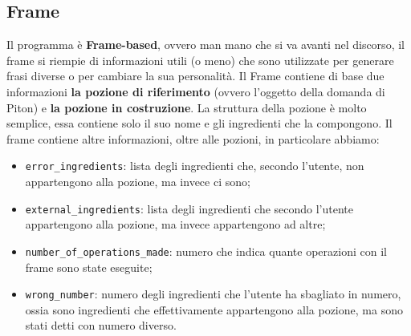 \subsection{Frame}
Il programma è \textbf{Frame-based}, ovvero man mano che si va avanti nel discorso, il frame si riempie di informazioni utili (o meno) che sono utilizzate per generare frasi diverse o per cambiare la sua personalità. Il Frame contiene di base due informazioni \textbf{la pozione di riferimento} (ovvero l'oggetto della domanda di Piton) e \textbf{la pozione in costruzione}.
La struttura della pozione è molto semplice, essa contiene solo il suo nome e gli ingredienti che la compongono. Il frame contiene altre informazioni, oltre alle pozioni, in particolare abbiamo:
\begin{itemize}
    \item \texttt{error\_ingredients}: lista degli ingredienti che, secondo l'utente, non appartengono alla pozione, ma invece ci sono;
    \item \texttt{external\_ingredients}: lista degli ingredienti che secondo l'utente appartengono alla pozione, ma invece appartengono ad altre;
    \item \texttt{number\_of\_operations\_made}: numero che indica quante operazioni con il frame sono state eseguite;
    \item \texttt{wrong\_number}: numero degli ingredienti che l'utente ha sbagliato in numero, ossia sono ingredienti che effettivamente appartengono alla pozione, ma sono stati detti con numero diverso.
\end{itemize}